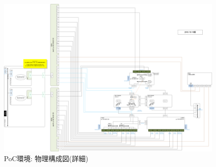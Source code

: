 \begin{landscape}
 \begin{figure}[h]
  \centering
  \includegraphics[scale=0.225]{img/poc-env-physical-detail.png}
  \caption{PoC環境: 物理構成図(詳細)}
  \label{fig:poc-env-physical-detail}
 \end{figure}
\end{landscape}


